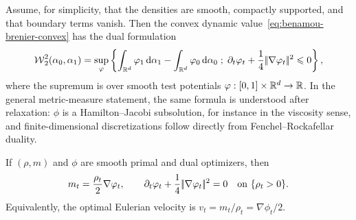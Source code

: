 \begin{prop}\label{prop-benamou-brenier-dual}
	Assume, for simplicity, that the densities are smooth, compactly supported, and that boundary terms vanish. Then the convex dynamic value~\eqref{eq:benamou-brenier-convex} has the dual formulation
	\begin{equation}\label{eq:benamou-brenier-dual}
		\operatorname{\mathcal{W}}_2^2(\alpha_0,\alpha_1)
		=
		\sup_{\varphi}
		\left\{ 
		\int_{\mathbb{R}^d}\varphi_1\,\mathrm{d}\alpha_1
		-
		\int_{\mathbb{R}^d}\varphi_0\,\mathrm{d}\alpha_0
		 \;;\; 
		\partial_t\varphi_t+\frac14|\!| \nabla\varphi_t |\!|^2\leqslant 0
		 \right\},
	\end{equation}
	where the supremum is over smooth test potentials $\varphi:[0,1]\times\mathbb{R}^d\to\mathbb{R}$. In the general metric-measure statement, the same formula is understood after relaxation: $\phi$ is a Hamilton--Jacobi subsolution, for instance in the viscosity sense, and finite-dimensional discretizations follow directly from Fenchel--Rockafellar duality.

	If $(\rho,m)$ and $\phi$ are smooth primal and dual optimizers, then
	\begin{equation}\label{eq:bb-primal-dual-relation}
		m_t=\frac{\rho_t}{2}\nabla\varphi_t,
		\qquad
		\partial_t\varphi_t+\frac14|\!| \nabla\varphi_t |\!|^2=0
		\quad\text{on }\{\rho_t>0\}.
	\end{equation}
	Equivalently, the optimal Eulerian velocity is $v_t=m_t/\rho_t=\nabla\phi_t/2$.
\end{prop}

